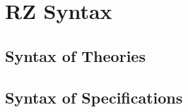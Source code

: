 \appendix

\chapter{RZ Syntax}
\label{cha:rz-syntax}

\section{Syntax of Theories}
\label{sec:syntax-theories}


\section{Syntax of Specifications}
\label{sec:synt-spec}



